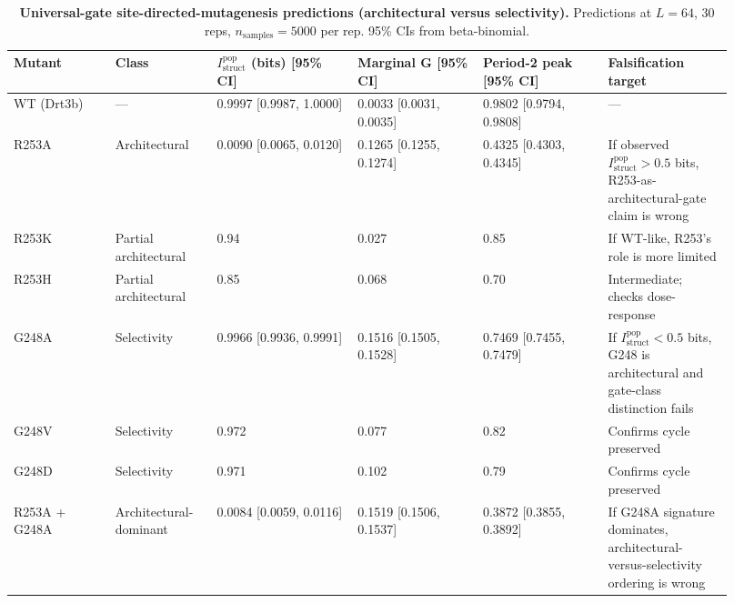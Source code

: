 \documentclass[aps,prx,reprint,amsmath,amssymb,floatfix,superscriptaddress,nofootinbib]{revtex4-2}
\theoremstyle{plain-thm}
\theoremstyle{definition-thm}
\newcommand{\Istructpop}{I_{\mathrm{struct}}^{\mathrm{pop}}}
\begin{document}
\begin{table}
\caption{\textbf{Universal-gate site-directed-mutagenesis predictions (architectural versus selectivity).} Predictions at $L = 64$, 30 reps, $n_{\mathrm{samples}} = 5000$ per rep. 95\% CIs from beta-binomial.}
\label{tab:sdm_predictions}
\begin{tabular}{p{0.13\linewidth} p{0.13\linewidth} p{0.18\linewidth} p{0.16\linewidth} p{0.16\linewidth} p{0.16\linewidth}}
\toprule
Mutant & Class & $\Istructpop$ (bits) [95\% CI] & Marginal G [95\% CI] & Period-2 peak [95\% CI] & Falsification target \\
\midrule
WT (Drt3b) & --- & 0.9997 [0.9987, 1.0000] & 0.0033 [0.0031, 0.0035] & 0.9802 [0.9794, 0.9808] & --- \\
R253A & Architectural & 0.0090 [0.0065, 0.0120] & 0.1265 [0.1255, 0.1274] & 0.4325 [0.4303, 0.4345] & If observed $\Istructpop > 0.5$ bits, R253-as-architectural-gate claim is wrong \\
R253K & Partial architectural & 0.94 & 0.027 & 0.85 & If WT-like, R253's role is more limited \\
R253H & Partial architectural & 0.85 & 0.068 & 0.70 & Intermediate; checks dose-response \\
G248A & Selectivity & 0.9966 [0.9936, 0.9991] & 0.1516 [0.1505, 0.1528] & 0.7469 [0.7455, 0.7479] & If $\Istructpop < 0.5$ bits, G248 is architectural and gate-class distinction fails \\
G248V & Selectivity & 0.972 & 0.077 & 0.82 & Confirms cycle preserved \\
G248D & Selectivity & 0.971 & 0.102 & 0.79 & Confirms cycle preserved \\
R253A + G248A & Architectural-dominant & 0.0084 [0.0059, 0.0116] & 0.1519 [0.1506, 0.1537] & 0.3872 [0.3855, 0.3892] & If G248A signature dominates, architectural-versus-selectivity ordering is wrong \\
\bottomrule
\end{tabular}
\end{table}
\end{document}
